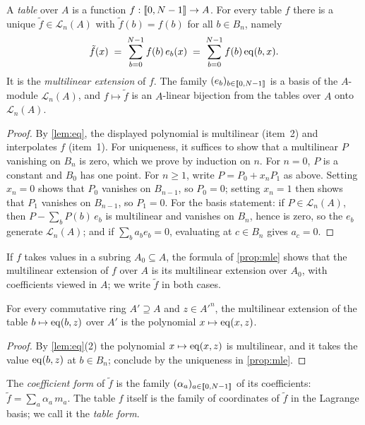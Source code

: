 \begin{proposition}\label{prop:mle}
A \emph{table} over $A$ is a function $f : \llbracket 0, N-1 \rrbracket \to A$.
For every table $f$ there is a unique $\tilde f \in \mathcal{L}_n(A)$ with $\tilde f(b) = f(b)$ for all $b \in B_n$, namely
\[
  \tilde f(x) \;=\; \sum_{b=0}^{N-1} f(b)\, e_b(x) \;=\; \sum_{b=0}^{N-1} f(b)\, \mathrm{eq}(b,x).
\]
It is the \emph{multilinear extension} of $f$.
The family $(e_b)_{b \in \llbracket 0, N-1 \rrbracket}$ is a basis of the $A$-module $\mathcal{L}_n(A)$, and $f \mapsto \tilde f$ is an $A$-linear bijection from the tables over $A$ onto $\mathcal{L}_n(A)$.
\end{proposition}

\begin{proof}
By \cref{lem:eq}, the displayed polynomial is multilinear (item~2) and interpolates $f$ (item~1).
For uniqueness, it suffices to show that a multilinear $P$ vanishing on $B_n$ is zero, which we prove by induction on $n$.
For $n = 0$, $P$ is a constant and $B_0$ has one point.
For $n \ge 1$, write $P = P_0 + x_n P_1$ as above.
Setting $x_n = 0$ shows that $P_0$ vanishes on $B_{n-1}$, so $P_0 = 0$; setting $x_n = 1$ then shows that $P_1$ vanishes on $B_{n-1}$, so $P_1 = 0$.
For the basis statement: if $P \in \mathcal{L}_n(A)$, then $P - \sum_b P(b)\, e_b$ is multilinear and vanishes on $B_n$, hence is zero, so the $e_b$ generate $\mathcal{L}_n(A)$; and if $\sum_b a_b e_b = 0$, evaluating at $c \in B_n$ gives $a_c = 0$.
\end{proof}

If $f$ takes values in a subring $A_0 \subseteq A$, the formula of \cref{prop:mle} shows that the multilinear extension of $f$ over $A$ is its multilinear extension over $A_0$, with coefficients viewed in $A$; we write $\tilde f$ in both cases.

\begin{corollary}\label{cor:eq-mle}
For every commutative ring $A' \supseteq A$ and $z \in A'^n$, the multilinear extension of the table $b \mapsto \mathrm{eq}(b,z)$ over $A'$ is the polynomial $x \mapsto \mathrm{eq}(x,z)$.
\end{corollary}

\begin{proof}
By \cref{lem:eq}(2) the polynomial $x \mapsto \mathrm{eq}(x,z)$ is multilinear, and it takes the value $\mathrm{eq}(b,z)$ at $b \in B_n$; conclude by the uniqueness in \cref{prop:mle}.
\end{proof}

\begin{definition}\label{def:coeff-form}
The \emph{coefficient form} of $\tilde f$ is the family $(\alpha_a)_{a \in \llbracket 0, N-1 \rrbracket}$ of its coefficients: $\tilde f = \sum_{a} \alpha_a\, m_a$.
The table $f$ itself is the family of coordinates of $\tilde f$ in the Lagrange basis; we call it the \emph{table form}.
\end{definition}


